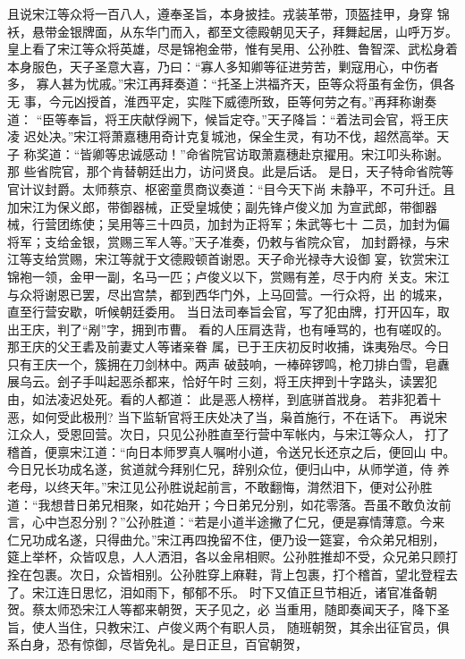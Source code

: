 且说宋江等众将一百八人，遵奉圣旨，本身披挂。戎装革带，顶盔挂甲，身穿
锦袄，悬带金银牌面，从东华门而入，都至文德殿朝见天子，拜舞起居，山呼万岁。
皇上看了宋江等众将英雄，尽是锦袍金带，惟有吴用、公孙胜、鲁智深、武松身着
本身服色，天子圣意大喜，乃曰：“寡人多知卿等征进劳苦，剿寇用心，中伤者多，
寡人甚为忧戚。”宋江再拜奏道：“托圣上洪福齐天，臣等众将虽有金伤，俱各无
事，今元凶授首，淮西平定，实陛下威德所致，臣等何劳之有。”再拜称谢奏道：
“臣等奉旨，将王庆献俘阙下，候旨定夺。”天子降旨：“着法司会官，将王庆凌
迟处决。”宋江将萧嘉穗用奇计克复城池，保全生灵，有功不伐，超然高举。天子
称奖道：“皆卿等忠诚感动！”命省院官访取萧嘉穗赴京擢用。宋江叩头称谢。那
些省院官，那个肯替朝廷出力，访问贤良。此是后话。
是日，天子特命省院等官计议封爵。太师蔡京、枢密童贯商议奏道：“目今天下尚
未静平，不可升迁。且加宋江为保义郎，带御器械，正受皇城使；副先锋卢俊义加
为宣武郎，带御器械，行营团练使；吴用等三十四员，加封为正将军；朱武等七十
二员，加封为偏将军；支给金银，赏赐三军人等。”天子准奏，仍敕与省院众官，
加封爵禄，与宋江等支给赏赐，宋江等就于文德殿顿首谢恩。天子命光禄寺大设御
宴，钦赏宋江锦袍一领，金甲一副，名马一匹；卢俊义以下，赏赐有差，尽于内府
关支。宋江与众将谢恩已罢，尽出宫禁，都到西华门外，上马回营。一行众将，出
的城来，直至行营安歇，听候朝廷委用。
当日法司奉旨会官，写了犯由牌，打开囚车，取出王庆，判了“剐”字，拥到市曹。
看的人压肩迭背，也有唾骂的，也有嗟叹的。那王庆的父王砉及前妻丈人等诸亲眷
属，已于王庆初反时收捕，诛夷殆尽。今日只有王庆一个，簇拥在刀剑林中。两声
破鼓响，一棒碎锣鸣，枪刀排白雪，皂纛展乌云。刽子手叫起恶杀都来，恰好午时
三刻，将王庆押到十字路头，读罢犯由，如法凌迟处死。看的人都道：
此是恶人榜样，到底骈首戕身。
若非犯着十恶，如何受此极刑?
当下监斩官将王庆处决了当，枭首施行，不在话下。
再说宋江众人，受恩回营。次日，只见公孙胜直至行营中军帐内，与宋江等众人，
打了稽首，便禀宋江道：“向日本师罗真人嘱咐小道，令送兄长还京之后，便回山
中。今日兄长功成名遂，贫道就今拜别仁兄，辞别众位，便归山中，从师学道，侍
养老母，以终天年。”宋江见公孙胜说起前言，不敢翻悔，潸然泪下，便对公孙胜
道：“我想昔日弟兄相聚，如花始开；今日弟兄分别，如花零落。吾虽不敢负汝前
言，心中岂忍分别？”公孙胜道：“若是小道半途撇了仁兄，便是寡情薄意。今来
仁兄功成名遂，只得曲允。”宋江再四挽留不住，便乃设一筵宴，令众弟兄相别，
筵上举杯，众皆叹息，人人洒泪，各以金帛相赆。公孙胜推却不受，众兄弟只顾打
拴在包裹。次日，众皆相别。公孙胜穿上麻鞋，背上包裹，打个稽首，望北登程去
了。宋江连日思忆，泪如雨下，郁郁不乐。
时下又值正旦节相近，诸官准备朝贺。蔡太师恐宋江人等都来朝贺，天子见之，必
当重用，随即奏闻天子，降下圣旨，使人当住，只教宋江、卢俊义两个有职人员，
随班朝贺，其余出征官员，俱系白身，恐有惊御，尽皆免礼。是日正旦，百官朝贺，
